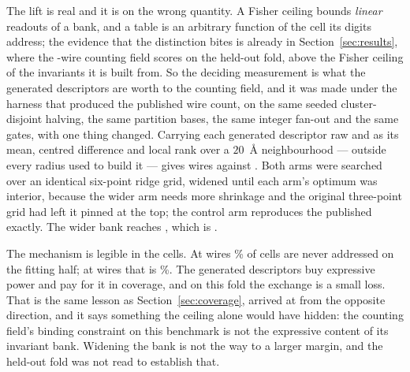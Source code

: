 \documentclass[11pt]{article}
\begin{document}
The lift is real and it is on the wrong quantity. A Fisher ceiling bounds
\emph{linear} readouts of a bank, and a table is an arbitrary function of the
cell its digits address; the evidence that the distinction bites is already in
Section~\ref{sec:results}, where the \GenWiresBase{}-wire counting field scores
\TabAuc{} on the held-out fold, above the \FisherAll{} Fisher ceiling of the
\NAlgFeatures{} invariants it is built from. So the deciding measurement is what
the generated descriptors are worth to the counting field, and it was made under
the harness that produced the published wire count, on the same seeded
cluster-disjoint halving, the same partition bases, the same integer fan-out and
the same gates, with one thing changed. Carrying each generated descriptor raw
and as its mean, centred difference and local rank over a \(20\)~\AA{}
neighbourhood --- outside every radius used to build it --- gives \GenWires{}
wires against \GenWiresBase{}. Both arms were searched over an identical
six-point ridge grid, widened until each arm's optimum was interior, because the
wider arm needs more shrinkage and the original three-point grid had left it
pinned at the top; the control arm reproduces the published \GenWireControlAuc{}
exactly. The wider bank reaches \GenWireAuc{}, which is \GenWireDelta{}.

The mechanism is legible in the cells. At \GenWiresBase{} wires
\GenWireControlEmpty{}\% of cells are never addressed on the fitting half; at
\GenWires{} wires that is \GenWireEmpty{}\%. The generated descriptors buy
expressive power and pay for it in coverage, and on this fold the exchange is a
small loss. That is the same lesson as
Section~\ref{sec:coverage}, arrived at from the opposite
direction, and it says something the ceiling alone would have hidden: the
counting field's binding constraint on this benchmark is not the expressive
content of its invariant bank. Widening the bank is not the way to a larger
margin, and the held-out fold was not read to establish that.
\end{document}
